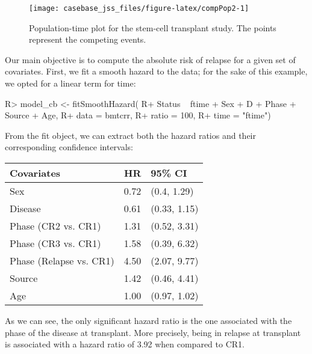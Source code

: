 \documentclass[article]{jss}
\begin{document}
\begin{CodeChunk}
\begin{figure}

{\centering \texttt{[image: casebase\_jss\_files/figure-latex/compPop2-1]} 

}

\caption{\label{fig:compPop2}Population-time plot for the stem-cell transplant study. The points represent the competing events.}\label{fig:compPop2}
\end{figure}
\end{CodeChunk}

Our main objective is to compute the absolute risk of relapse for a
given set of covariates. First, we fit a smooth hazard to the data; for
the sake of this example, we opted for a linear term for time:

\begin{CodeChunk}

\begin{CodeInput}
R> model_cb <- fitSmoothHazard(
R+     Status ~ ftime + Sex + D + Phase + Source + Age, 
R+     data = bmtcrr, 
R+     ratio = 100, 
R+     time = "ftime")
\end{CodeInput}
\end{CodeChunk}

From the fit object, we can extract both the hazard ratios and their
corresponding confidence intervals:

\begin{CodeChunk}

\begin{tabular}{l|r|l}
\hline
Covariates & HR & 95\% CI\\
\hline
Sex & 0.72 & (0.4, 1.29)\\
\hline
Disease & 0.61 & (0.33, 1.15)\\
\hline
Phase (CR2 vs. CR1) & 1.31 & (0.52, 3.31)\\
\hline
Phase (CR3 vs. CR1) & 1.58 & (0.39, 6.32)\\
\hline
Phase (Relapse vs. CR1) & 4.50 & (2.07, 9.77)\\
\hline
Source & 1.42 & (0.46, 4.41)\\
\hline
Age & 1.00 & (0.97, 1.02)\\
\hline
\end{tabular}

\end{CodeChunk}

As we can see, the only significant hazard ratio is the one associated
with the phase of the disease at transplant. More precisely, being in
relapse at transplant is associated with a hazard ratio of 3.92 when
compared to CR1.
\end{document}

